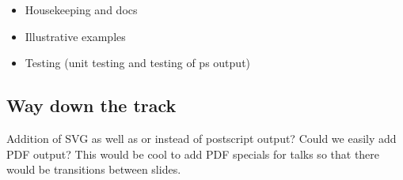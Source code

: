 \documentclass[12pt,a4paper]{article}
\begin{document}
\begin{itemize}
\item Housekeeping and docs
\item Illustrative examples
\item Testing (unit testing and testing of ps output)
\end{itemize}

\subsection{Way down the track}

Addition of SVG as well as or instead of postscript output?  Could we easily
add PDF output?  This would be cool to add PDF specials for talks so that
there would be transitions between slides.
\end{document}
